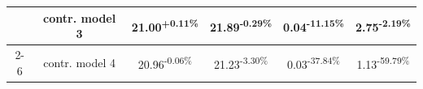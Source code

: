 \begin{table}[h]
\begin{tabular}{c|c|c|c|c|c}
    & contr. model 3 & \cellcolor{green!3} 21.00\textsuperscript{\scriptsize +0.11\%} & \cellcolor{red!3} 21.89\textsuperscript{\scriptsize -0.29\%} & \cellcolor{green!15} 0.04\textsuperscript{\scriptsize -11.15\%} & \cellcolor{green!7} 2.75\textsuperscript{\scriptsize -2.19\%} \\ \cline{2-6}
    & contr. model 4 & \cellcolor{red!3} 20.96\textsuperscript{\scriptsize -0.06\%} & \cellcolor{red!8} 21.23\textsuperscript{\scriptsize -3.30\%} & \cellcolor{green!28} 0.03\textsuperscript{\scriptsize -37.84\%} & \cellcolor{green!35} 1.13\textsuperscript{\scriptsize -59.79\%} \\ \hline
    \end{tabular}
\end{table}